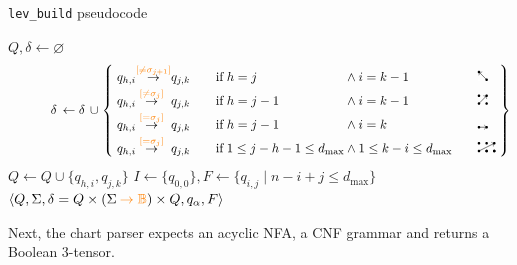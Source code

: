\documentclass[sigplan,review,acmsmall,nonacm,screen,anonymous]{acmart}\settopmatter{printfolios=false,printccs=false,printacmref=false}
\begin{document}
\begin{algorithm}[H]
\caption{\texttt{lev\_build} pseudocode}
\label{alg:lev_build}
\begin{algorithmic}[1]
   
  \State $Q, \delta \gets \varnothing$
    \State \vspace{-1.65cm}\[\hspace{1.15cm}\delta\,\gets \delta\,\cup\:\!\left\{
        \begin{alignedat}{9}
          &\;& q_{h,i} &\hspace{-0.1cm}\overset{{\color{orange}[\neq\sigma_{j+1}]}}{\rightarrow} &q_{j,k} &\qquad& \text{if}\;& h = j   &\:\land\:& i = k-1  &\qquad& \duparrow\\[-2pt]
          && q_{h,i}   &\overset{{\color{orange}[\neq\sigma_j]}}{\rightarrow} &q_{j,k} &&       \text{if}\;& h = j-1 &\:\land\:& i = k-1  &&       \ddiagarrow\\[-2pt]
          && q_{h,i}   &\overset{{\color{orange}[=\sigma_j]}}{\rightarrow}    &q_{j,k} &&       \text{if}\;& h = j-1 &\:\land\:& i = k    &&       \drightarrow\\[-2pt]
          && q_{h,i}   &\overset{{\color{orange}[=\sigma_j]}}{\rightarrow}    &q_{j,k} &&       \text{if}\;& 1 \leq j - h - 1 \leq d_{\max} &\:\land\:& 1 \leq k - i \leq d_{\max}   && \knightarrow\;
        \end{alignedat}
      \right\}\]
    \State $Q \gets Q \cup \{q_{h,i}, q_{j,k}\}$
  \EndFor
  \State $I \gets \{q_{0,0}\}, F \gets \{q_{i, j} \mid n - i + j \leq d_{\max}\}$
  \State \Return $\langle Q, \Sigma, \delta = Q \times (\Sigma\:{\color{orange}\rightarrow \mathbb{B}}) \times Q, q_\alpha, F\rangle$  
\end{algorithmic}
\end{algorithm}\vspace{-0.2cm}

\noindent Next, the chart parser expects an acyclic NFA, a CNF grammar and returns a Boolean 3-tensor.
\end{document}
